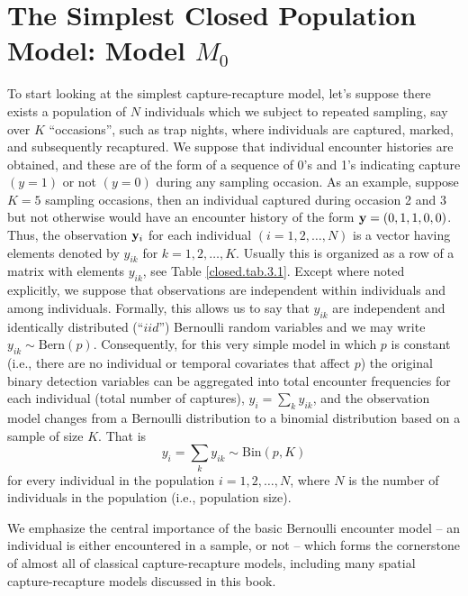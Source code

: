\section{The Simplest Closed Population Model: Model $M_0$}

To start looking at the simplest capture-recapture model, let's suppose
there exists a population of $N$ individuals which we
subject to repeated sampling, say over $K$ ``occasions'', such as trap nights, where individuals
are captured, marked, and subsequently recaptured.  We suppose that
individual encounter histories are obtained, and these are of the form
of a sequence of 0's and 1's indicating capture $(y=1)$ or not $(y=0)$
during any sampling occasion.%
As an example, suppose
$K=5$ sampling occasions, then an individual captured during occasion %
2 and 3 but not otherwise would have an encounter history of the form
${\bf y}=(0,1,1,0,0)$. Thus, the observation ${\bf y}_{i}$ for each
individual $(i=1,2,\hdots,N)$ is a vector having elements denoted by $y_{ik}$ for
$k=1,2,\hdots,K$. Usually this is organized as a row of a matrix with
elements $y_{ik}$, see Table \ref{closed.tab.3.1}. Except where noted
explicitly, we suppose that observations are independent within
individuals and among individuals.  Formally, this allows us to say
that $y_{ik}$ are independent and identically distributed (``$iid$'')
Bernoulli random variables and we may write $y_{ik}
\sim \mbox{Bern}(p)$.  Consequently, for this very simple model in
which $p$ is constant (i.e., there are no individual or temporal
covariates that affect $p$) the original binary detection variables
can be aggregated into total encounter frequencies for each individual
(total number of captures), $y_{i} = \sum_{k} y_{ik}$, and the
observation model changes from a Bernoulli distribution to a
binomial distribution based on a sample of size $K$. That is
\[
y_{i}  = \sum_{k} y_{ik} \sim \mbox{Bin}(p,K)
\]
for every individual in the population $i=1,2,\ldots,N$, where $N$ is
the number of individuals in the population (i.e., population size).

We emphasize the central importance of the basic Bernoulli encounter model
-- an individual is either encountered in a sample, or not --
 which forms
the cornerstone of almost all of classical
capture-recapture models, including many spatial capture-recapture
models discussed in this book.

